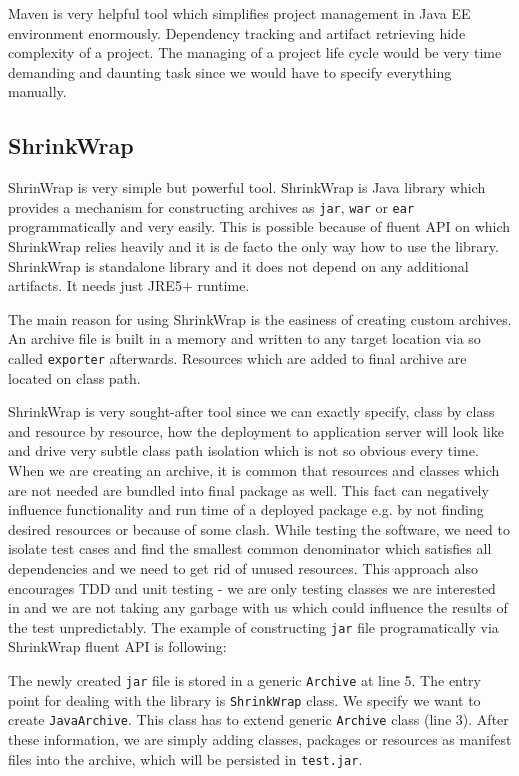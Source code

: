 \documentclass[12pt,final,oneside]{fithesis}
\begin{document}
Maven is very helpful tool which simplifies project management in Java EE environment enormously. Dependency tracking and artifact retrieving hide complexity of a project. The managing of a project life cycle would be very time demanding and daunting task since we would have to specify everything manually. 

	\subsection{ShrinkWrap}

ShrinWrap is very simple but powerful tool. ShrinkWrap is Java library which provides a mechanism for constructing archives as \texttt{jar}, \texttt{war} or \texttt{ear} programmatically and very easily. This is possible because of fluent API on which ShrinkWrap relies heavily and it is de facto the only way how to use the library. ShrinkWrap is standalone library and it does not depend on any additional artifacts. It needs just JRE5+ runtime.

The main reason for using ShrinkWrap is the easiness of creating custom archives. An archive file is built in a memory and written to any target location via so called \texttt{exporter} afterwards. Resources which are added to final archive are located on class path.

ShrinkWrap is very sought-after tool since we can exactly specify, class by class and resource by resource, how the deployment to application server will look like and drive very subtle class path isolation which is not so obvious every time. When we are creating an archive, it is common that resources and classes which are not needed are bundled into final package as well. This fact can negatively influence functionality and run time of a deployed package e.g. by not finding desired resources or because of some clash. While testing the software, we need to isolate test cases and find the smallest common denominator which satisfies all dependencies and we need to get rid of unused resources. This approach also encourages TDD and unit testing - we are only testing classes we are interested in and we are not taking any garbage  with us which could influence the results of the test unpredictably. The example of constructing \texttt{jar} file programatically via ShrinkWrap fluent API is following: 



The newly created \texttt{jar} file is stored in a generic \texttt{Archive} at line 5. The entry point for dealing with the library is \texttt{ShrinkWrap} class. We specify we want to create \texttt{JavaArchive}. This class has to extend generic \texttt{Archive} class (line 3). After these information, we are simply adding classes, packages or resources as manifest files into the archive, which will be persisted in \texttt{test.jar}.
\end{document}
